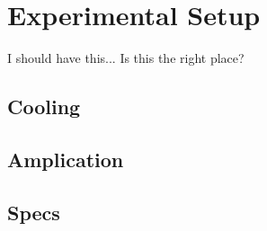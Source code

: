 \section{Experimental Setup}
I should have this... Is this the right place? 

\subsection{Cooling}

\subsection{Amplication}

\subsection{Specs}








